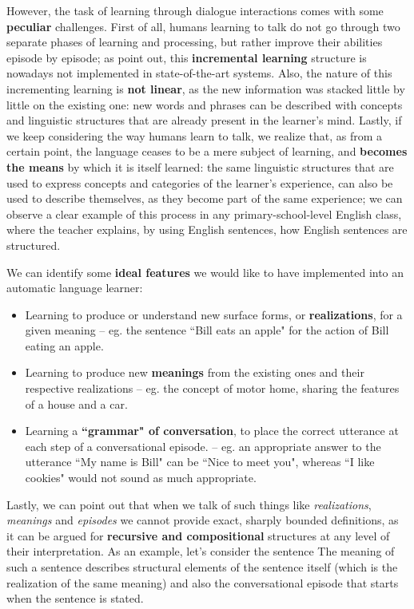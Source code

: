 However, the task of learning through dialogue interactions comes with some \textbf{peculiar} challenges. First of all, humans learning to talk do not go through two separate phases of learning and processing, but rather improve their abilities episode by episode; as \cite{2095408} point out, this \textbf{incremental learning} structure is nowadays not implemented in state-of-the-art systems. Also, the nature of this incrementing learning is \textbf{not linear}, as the new information was stacked little by little on the existing one: new words and phrases can be described with concepts and linguistic structures that are already present in the learner's mind. Lastly, if we keep considering the way humans learn to talk, we realize that, as from a certain point, the language ceases to be a mere subject of learning, and \textbf{becomes the means} by which it is itself learned: the same linguistic structures that are used to express concepts and categories of the learner's experience, can also be used to describe themselves, as they become part of the same experience; we can observe a clear example of this process in any primary-school-level English class, where the teacher explains, by using English sentences, how English sentences are structured.

We can identify some \textbf{ideal features} we would like to have implemented into an automatic language learner:
\begin{itemize}
	\item Learning to produce or understand new surface forms, or \textbf{realizations}, for a given meaning -- eg. the sentence ``Bill eats an apple" for the action of Bill eating an apple.
	\item Learning to produce new \textbf{meanings} from the existing ones and their respective realizations -- eg. the concept of motor home, sharing the features of a house and a car.
	\item Learning a \textbf{``grammar" of conversation}, to place the correct utterance at each step of a conversational episode. -- eg. an appropriate answer to the utterance ``My name is Bill" can be ``Nice to meet you", whereas ``I like cookies" would not sound as much appropriate.
\end{itemize}
Lastly, we can point out that when we talk of such things like \emph{realizations}, \emph{meanings} and \emph{episodes} we cannot provide exact, sharply bounded definitions, as it can be argued for \textbf{recursive and compositional} structures at any level of their interpretation. As an example, let's consider the sentence  The meaning of such a sentence describes structural elements of the sentence itself (which is the realization of the same meaning) and also the conversational episode that starts when the sentence is stated.

